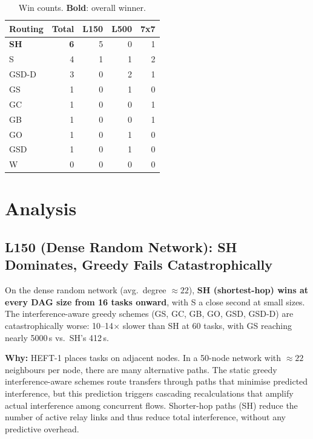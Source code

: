 \documentclass[11pt]{article}
\begin{document}
\begin{table}[H]
\centering
\begin{tabular}{l r r r r}
\toprule
\textbf{Routing} & \textbf{Total} & \textbf{L150} & \textbf{L500} & \textbf{7x7} \\
\midrule
  \textbf{SH} & \textbf{6} & 5 & 0 & 1 \\
  S & 4 & 1 & 1 & 2 \\
  GSD\mbox{-}D & 3 & 0 & 2 & 1 \\
  GS & 1 & 0 & 1 & 0 \\
  GC & 1 & 0 & 0 & 1 \\
  GB & 1 & 0 & 0 & 1 \\
  GO & 1 & 0 & 1 & 0 \\
  GSD & 1 & 0 & 1 & 0 \\
  W & 0 & 0 & 0 & 0 \\
\bottomrule
\end{tabular}
\caption{Win counts. \textbf{Bold}: overall winner.}
\end{table}


\section{Analysis}

\subsection{L150 (Dense Random Network): SH Dominates, Greedy Fails Catastrophically}

On the dense random network (avg.\ degree $\approx22$), \textbf{SH (shortest-hop)
wins at every DAG size from 16 tasks onward}, with S a close second at small sizes.
The interference-aware greedy schemes (GS, GC, GB, GO, GSD, GSD-D) are catastrophically
worse: 10--14$\times$ slower than SH at 60 tasks, with GS reaching nearly 5000\,s
vs.\ SH's 412\,s.

\textbf{Why:} HEFT-1 places tasks on adjacent nodes.  In a 50-node network with
$\approx22$ neighbours per node, there are many alternative paths.  The static
greedy interference-aware schemes route transfers through paths that minimise
predicted interference, but this prediction triggers cascading recalculations that
amplify actual interference among concurrent flows.  Shorter-hop paths (SH) reduce
the number of active relay links and thus reduce total interference, without any
predictive overhead.
\end{document}
